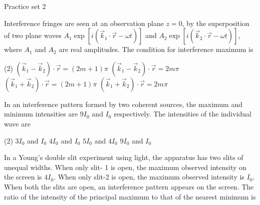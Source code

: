 \newpage 
\begin{abox}
	Practice set 2
	\end{abox}
\begin{enumerate}
	\begin{minipage}{\textwidth}
		\item Interference fringes are seen at an observation plane $z=0$, by the superposition of two plane waves $A_{1} \exp \left[i\left(\vec{k}_{1} \cdot \vec{r}-\omega t\right)\right]$ and $A_{2} \exp \left[i\left(\vec{k}_{2} \cdot \vec{r}-\omega t\right)\right]$, where $A_{1}$ and $A_{2}$ are real amplitudes. The condition for interference maximum is
	\end{minipage}
	\begin{tasks}(2)
		\task[\textbf{A.}] $\left(\vec{k}_{1}-\vec{k}_{2}\right) \cdot \vec{r}=(2 m+1) \pi$
		\task[\textbf{B.}]$\left(\vec{k}_{1}-\vec{k}_{2}\right) \cdot \vec{r}=2 m \pi$
		\task[\textbf{C.}] $\left(\vec{k}_{1}+\vec{k}_{2}\right) \cdot \vec{r}=(2 m+1) \pi$
		\task[\textbf{D.}] $\left(\vec{k}_{1}+\vec{k}_{2}\right) \cdot \vec{r}=2 m \pi$
	\end{tasks}
\begin{minipage}{\textwidth}
	\item In an interference pattern formed by two coherent sources, the maximum and minimum intensities are $9 I_{0}$ and $I_{0}$ respectively. The intensities of the individual wave are
\end{minipage}
\begin{tasks}(2)
	\task[\textbf{A.}] $3 I_{0}$ and $I_{0}$ 
	\task[\textbf{B.}]$4 I_{0}$ and $I_{0}$
	\task[\textbf{C.}]$5 I_{0}$ and $4 I_{0}$
	\task[\textbf{D.}]$9 I_{0}$ and $I_{0}$
\end{tasks}
\begin{minipage}{\textwidth}
	\item In a Young's double slit experiment using light, the apparatus has two slits of unequal widths. When only slit- 1 is open, the maximum observed intensity on the screen is $4 I_{0}$. When only slit-2 is open, the maximum observed intensity is $I_{0}$. When both the slits are open, an interference pattern appears on the screen. The ratio of the intensity of the principal maximum to that of the nearest minimum is
\end{minipage}

\end{enumerate}
\setlength\arrayrulewidth{1pt}
